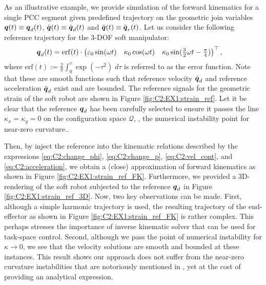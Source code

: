 \newpage
\begin{example}
As an illustrative example, we provide simulation of the forward kinematics for a single PCC segment given predefined trajectory on the geometric join variables ${\boldsymbol{q}}(t) \equiv {\boldsymbol{q}}_d(t)$, $\dot{{\boldsymbol{q}}}(t) \equiv \dot{{\boldsymbol{q}}}_d(t)$ and $\ddot{{\boldsymbol{q}}}(t) \equiv \ddot{{\boldsymbol{q}}}_r(t)$. Let us consider the following reference trajectory for the 3-DOF soft manipulator:
%
\begin{align*}
{\boldsymbol{q}}_d(t) &  =  \textup{\textrm{erf}}(t) \cdot \begin{pmatrix} \varepsilon_0 \sin(\omega t) & \kappa_0 \cos(\omega t) & \kappa_0 \sin(\tfrac{3}{2}\omega t - \tfrac{\pi}{4}) \end{pmatrix}^\top,
\end{align*}
%
where $\textrm{erf}(t) := \frac{2}{\pi}\int_0^\tau \exp(-\tau^2) \; d\tau$ is referred to as the error function. Note that these are smooth functions such that reference velocity ${\dot{\boldsymbol{q}}}_d$ and reference acceleration ${\ddot{\boldsymbol{q}}}_d$ exist and are bounded. The reference signals for the geometric strain of the soft robot are shown in Figure \ref{fig:C2:EX1:strain_ref}. Let it be clear that the reference ${\boldsymbol{q}}_d$ has been carefully selected to ensure it passes the line $\kappa_x = \kappa_y = 0$ on the configuration space
$\mathcal{Q}$, \ie, the numerical instability point for near-zero curvature..

Then, by inject the reference into the kinematic relations described by the expressions \eqref{eq:C2:change_phi}, \eqref{eq:C2:change_p}, \eqref{eq:C2:vel_cont}, and \eqref{eq:C2:acceleration}, we obtain a (close) approximation of forward kinematics as shown in Figure
\ref{fig:C2:EX1:strain_ref_FK}. Furthermore, we provided a 3D-rendering of the soft robot subjected to the reference ${\boldsymbol{q}}_d$ in Figure \ref{fig:C2:EX1:strain_ref_3D}. Now, two key observations can be made. First, although a simple harmonic trajectory is used, the resulting trajectory of the end-effector as shown in Figure \ref{fig:C2:EX1:strain_ref_FK} is rather complex. This perhaps stresses the importance of inverse kinematic solver that can be used for task-space control. Second, although we pass the point of numerical instability for
$\kappa \to 0$, we see that the velocity solutions are smooth and bounded at these instances. This result shows our approach does not suffer from the near-zero curvature instabilities that are notoriously mentioned in \cite{Falkenhahn2015,DellaSantina2020}, yet at the cost of providing an analytical expression.


\end{example}
